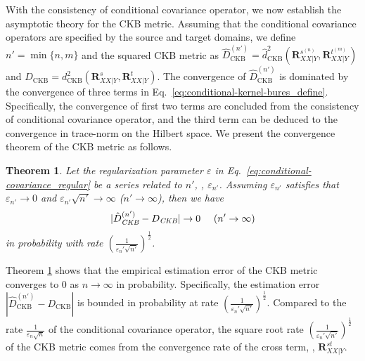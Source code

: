 \documentclass[final]{cvpr}
\newcommand{\MBF}{\mathbf}
\newtheorem{theorem}{Theorem}
\begin{document}
With the consistency of conditional covariance operator, we now establish the asymptotic theory for the CKB metric. Assuming that the conditional covariance operators are specified by the source and target domains, we define $n'=\min\{n,m\}$ and the squared CKB metric as $\hat{D}^{(n')}_{\text{CKB}}=\hat{d}_{\text{CKB}}^2(\MBF{R}^{s^{(n)}}_{XX|Y},\MBF{R}^{t^{(m)}}_{XX|Y})$ and $D_{\text{CKB}}=d_{\text{CKB}}^2(\MBF{R}^{s}_{XX|Y},\MBF{R}^{t}_{XX|Y})$. The convergence of $\hat{D}^{(n')}_{\text{CKB}}$ is dominated by the convergence of three terms in Eq.~\eqref{eq:conditional-kernel-bures_define}. Specifically, the convergence of first two terms are concluded from the consistency of conditional covariance operator, and the third term can be deduced to the convergence in trace-norm on the Hilbert space. We present the convergence theorem of the CKB metric as follows.
\begin{theorem}\label{thm:convergence_CKB}
Let the regularization parameter $\varepsilon$ in Eq.~\eqref{eq:conditional-covariance_regular} be a series related to $n'$, \ie, $\varepsilon_{n'}$. Assuming $\varepsilon_{n'}$ satisfies that $\varepsilon_{n'} \to 0$ and $\varepsilon_{n'} \sqrt{n'} \to \infty$ ($n' \to \infty$), then we have
\begin{equation*}\label{eq:convergence_CKB}
|\hat{D}^{(n')}_{\emph{CKB}} - D_{\emph{CKB}}| \to 0 ~~~~ (n' \to \infty)
\end{equation*}
in probability with rate $ (\frac{1}{\varepsilon_n' \sqrt{n'}})^{\frac{1}{2}} $.
\end{theorem}

Theorem \ref{thm:convergence_CKB} shows that the empirical estimation error of the CKB metric converges to 0 as $n\to \infty$ in probability. Specifically, the estimation error $|\hat{D}^{(n')}_{\text{CKB}} - D_{\text{CKB}}|$ is bounded in probability at rate $ (\frac{1}{\varepsilon_n' \sqrt{n'}})^{\frac{1}{2}} $. Compared to the rate $\frac{1}{\varepsilon_n \sqrt{n}}$ of the conditional covariance operator, the square root rate $ (\frac{1}{\varepsilon_n' \sqrt{n'}})^{\frac{1}{2}} $ of the CKB metric comes from the convergence rate of the cross term, \ie, $\MBF{R}^{st}_{XX|Y}$.

\end{document}
